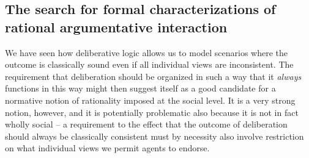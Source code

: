 \documentclass[greybox]{svmult}
\begin{document}
\begin{example}\label{ex:ad}

\end{example}

\subsection{The search for formal characterizations of rational argumentative interaction}\label{sub:for}

We have seen how deliberative logic allows us to model scenarios where the outcome is classically sound even if all individual views are inconsistent. The requirement that deliberation should be organized in such a way that it \emph{always} functions in this way might then suggest itself as a good candidate for a normative notion of rationality imposed at the social level. It is a very strong notion, however, and it is potentially problematic also because it is not in fact wholly social -- a requirement to the effect that the outcome of deliberation should always be classically consistent must by necessity also involve restriction on what individual views we permit agents to endorse. 
\end{document}
